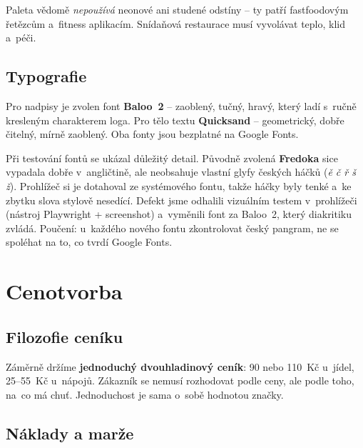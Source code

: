 \documentclass[12pt,a4paper]{article}
\begin{document}
Paleta vědomě \emph{nepoužívá} neonové ani studené odstíny -- ty patří fastfoodovým řetězcům a~fitness aplikacím. Snídaňová restaurace musí vyvolávat teplo, klid a~péči.

\subsection{Typografie}

Pro nadpisy je zvolen font \textbf{Baloo~2} -- zaoblený, tučný, hravý, který ladí s~ručně kresleným charakterem loga. Pro tělo textu \textbf{Quicksand} -- geometrický, dobře čitelný, mírně zaoblený. Oba fonty jsou bezplatné na Google Fonts.

Při testování fontů se ukázal důležitý detail. Původně zvolená \textbf{Fredoka} sice vypadala dobře v~angličtině, ale neobsahuje vlastní glyfy českých háčků (\textit{ě č ř š ž}). Prohlížeč si je dotahoval ze systémového fontu, takže háčky byly tenké a~ke zbytku slova stylově nesedící. Defekt jsme odhalili vizuálním testem v~prohlížeči (nástroj Playwright + screenshot) a~vyměnili font za Baloo~2, který diakritiku zvládá. Poučení: u~každého nového fontu zkontrolovat český pangram, ne se spoléhat na to, co tvrdí Google Fonts.

\section{Cenotvorba}

\subsection{Filozofie ceníku}

Záměrně držíme \textbf{jednoduchý dvouhladinový ceník}: 90 nebo 110~Kč u~jídel, 25--55~Kč u~nápojů. Zákazník se nemusí rozhodovat podle ceny, ale podle toho, na~co má chuť. Jednoduchost je sama o~sobě hodnotou značky.

\subsection{Náklady a marže}
\end{document}
